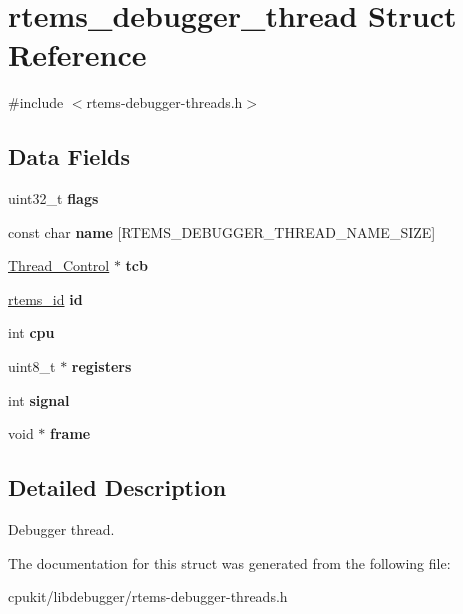 \hypertarget{structrtems__debugger__thread}{}\section{rtems\+\_\+debugger\+\_\+thread Struct Reference}
\label{structrtems__debugger__thread}


{\ttfamily \#include $<$rtems-\/debugger-\/threads.\+h$>$}

\subsection*{Data Fields}
\begin{DoxyCompactItemize}
\item 
\mbox{\label{structrtems__debugger__thread_aec5be32f9991bbb5c5f7de31d84e44bc}} 
uint32\+\_\+t {\bfseries flags}
\item 
\mbox{\label{structrtems__debugger__thread_ae209477f94acdfe607a2c8526c100699}} 
const char {\bfseries name} \mbox{[}R\+T\+E\+M\+S\+\_\+\+D\+E\+B\+U\+G\+G\+E\+R\+\_\+\+T\+H\+R\+E\+A\+D\+\_\+\+N\+A\+M\+E\+\_\+\+S\+I\+ZE\mbox{]}
\item 
\mbox{\label{structrtems__debugger__thread_a4a036ea5408e6f15bf2febca9f9611fb}} 
\mbox{\hyperlink{struct__Thread__Control}{Thread\+\_\+\+Control}} $\ast$ {\bfseries tcb}
\item 
\mbox{\label{structrtems__debugger__thread_afd653d3a7d923ab1b70c95ab3eae827d}} 
\mbox{\hyperlink{group__ClassicTasks_gab20892b814dced7dd4e5b9bf42becd57}{rtems\+\_\+id}} {\bfseries id}
\item 
\mbox{\label{structrtems__debugger__thread_a36fb972e52af865c88fa0f93eac50ca9}} 
int {\bfseries cpu}
\item 
\mbox{\label{structrtems__debugger__thread_aec1bd4a987f2222b278195b0882d7dce}} 
uint8\+\_\+t $\ast$ {\bfseries registers}
\item 
\mbox{\label{structrtems__debugger__thread_a158554d27eebe39abccd2e6cc1420163}} 
int {\bfseries signal}
\item 
\mbox{\label{structrtems__debugger__thread_af85b4094466c4b06696ba58cce0b9b42}} 
void $\ast$ {\bfseries frame}
\end{DoxyCompactItemize}


\subsection{Detailed Description}
Debugger thread. 

The documentation for this struct was generated from the following file\+:\begin{DoxyCompactItemize}
\item 
cpukit/libdebugger/rtems-\/debugger-\/threads.\+h\end{DoxyCompactItemize}
